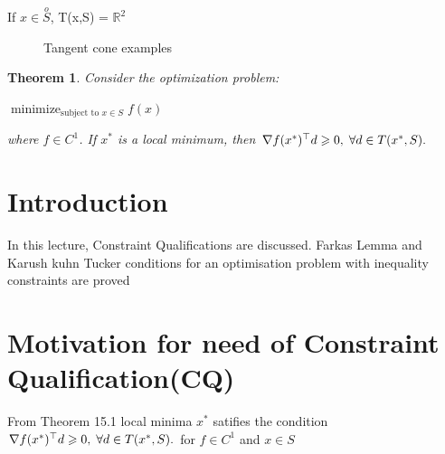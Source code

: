 \documentclass[twoside]{article}
\newcounter{lecnum}
\newtheorem{theorem}{Theorem}[lecnum]
\DeclareMathOperator*{\minimize}{minimize}
\begin{document}
If $x \in \overset{o}{S}$, T(x,S) = $\mathbb{R}^2$
\begin{figure}[h]
	\centering
    \qquad
    \caption{Tangent cone examples}
    \label{fig:example}
\end{figure}

\begin{theorem}
Consider the optimization problem:
\begin{center}
    $\displaystyle{\minimize_{\text{subject to }x\in S} f(x)}$
\end{center}
where $f \in C^{1}$. If $x^{*}$ is a local minimum, then $\nabla f(x^{*})^{\top}d \geqslant 0, \hspace{1mm}\forall d \in T(x^{*},S).$
\end{theorem}



\section{Introduction}
In this lecture, Constraint Qualifications are discussed. Farkas Lemma and Karush kuhn Tucker conditions for an optimisation problem with inequality constraints are proved  

\section{Motivation for need of Constraint Qualification(CQ)}
From Theorem 15.1 local minima $x^*$ satifies the condition $\nabla f(x^{*})^{\top}d \geqslant 0, \hspace{1mm}\forall d \in T(x^{*},S).$ for $f \in C^{1}$ and $x \in S$
\end{document}
